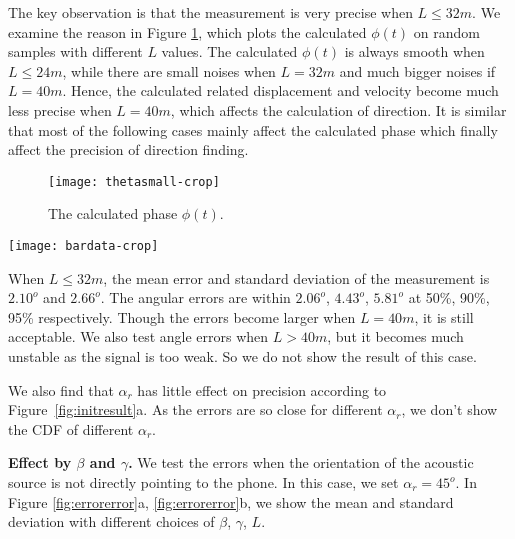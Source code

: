 \documentclass[]{sig-alternate-10pt}
\begin{document}
The key observation is that the measurement is very precise when
$L\leq32m$.  We examine the
reason in Figure \ref{fig:phasemeter}, which plots the calculated
$\phi(t)$ on random samples with different $L$ values. The calculated
$\phi(t)$ is always smooth when $L \leq 24m$, while there are
small noises when $L=32m$ and much bigger noises if
$L=40m$. Hence, the calculated related displacement and velocity
become much less precise when $L=40m$, which affects the
calculation of direction. It is similar that most of the following
cases mainly affect the calculated phase which finally affect the
precision of direction finding.

\begin{figure}[h]
    \begin{center}
        \texttt{[image: thetasmall-crop]}
    \end{center}
    \caption{The calculated phase $\phi(t)$.}
    \label{fig:phasemeter}
\end{figure}

\begin{figure*}[htpb]
    \begin{center}
        \texttt{[image: bardata-crop]}
    \end{center}
    \caption{Effect by (a) $\beta$ and $\gamma$ when $L=8m$
      (b) $\beta$ and $\gamma$ when $L=32m$ (c) motion
      pattern (d) non-line of sight (e) man-made multipath (f)
      multipath from the wall.}
    \label{fig:errorerror}
\end{figure*}
When $L\leq 32m$, the mean error and standard
deviation of the measurement is $2.10^o$ and $2.66^o$. The angular
errors are within $2.06^o$, $4.43^o$, $5.81^o$ at  50\%,
90\%, 95\% respectively. Though the errors become larger when
$L=40m$, it is still acceptable. We also test angle
errors when $L>40m$, but it becomes much unstable as the signal is
too weak. So we do not show the result of this case.

We also find that  $\alpha_r$ has little effect on precision according
to Figure~\ref{fig:initresult}a.  As the errors are so close for
different $\alpha_r$, we don't show the CDF of different $\alpha_r$.


\noindent\textbf{Effect by $\beta$ and $\gamma$.}
We test the errors when the orientation of the acoustic source is not
directly pointing to the phone. In this case, we set
$\alpha_r=45^o$. In Figure \ref{fig:errorerror}a, \ref{fig:errorerror}b, we show
the mean and standard deviation with different choices of
$\beta$, $\gamma$, $L$.
\end{document}
